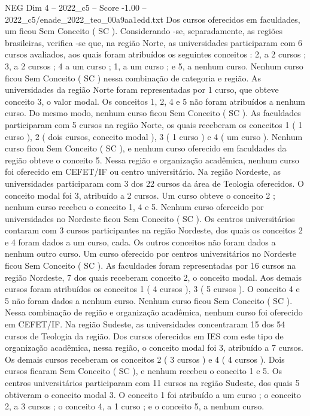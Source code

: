 \begin{textsample}{NEG Dim 4 – 2022\_c5 – Score -1.00 – 2022\_c5/enade\_2022\_teo\_00a9aa1edd.txt}
Dos cursos oferecidos em faculdades, um ficou Sem Conceito ( SC ).
Considerando -se, separadamente, as regiões brasileiras, verifica -se que, na região Norte, as universidades participaram com 6 cursos avaliados, aos quais foram atribuídos os seguintes conceitos : 2, a 2 cursos ; 3, a 2 cursos ; 4 a um curso ; 1, a um curso ; e 5, a nenhum curso.
Nenhum curso ficou Sem Conceito ( SC ) nessa combinação de categoria e região.
As universidades da região Norte foram representadas por 1 curso, que obteve conceito 3, o valor modal.
Os conceitos 1, 2, 4 e 5 não foram atribuídos a nenhum curso.
Do mesmo modo, nenhum curso ficou Sem Conceito ( SC ).
As faculdades participaram com 5 cursos na região Norte, os quais receberam os conceitos 1 ( 1 curso ), 2 ( dois cursos, conceito modal ), 3 ( 1 curso ) e 4 ( um curso ).
Nenhum curso ficou Sem Conceito ( SC ), e nenhum curso oferecido em faculdades da região obteve o conceito 5.
Nessa região e organização acadêmica, nenhum curso foi oferecido em CEFET/IF ou centro universitário.
Na região Nordeste, as universidades participaram com 3 dos 22 cursos da área de Teologia oferecidos.
O conceito modal foi 3, atribuído a 2 cursos.
Um curso obteve o conceito 2 ; nenhum curso recebeu o conceito 1, 4 e 5.
Nenhum curso oferecido por universidades no Nordeste ficou Sem Conceito ( SC ).
Os centros universitários contaram com 3 cursos participantes na região Nordeste, dos quais os conceitos 2 e 4 foram dados a um curso, cada.
Os outros conceitos não foram dados a nenhum outro curso.
Um curso oferecido por centros universitários no Nordeste ficou Sem Conceito ( SC ).
As faculdades foram representadas por 16 cursos na região Nordeste, 7 dos quais receberam conceito 2, o conceito modal.
Aos demais cursos foram atribuídos os conceitos 1 ( 4 cursos ), 3 ( 5 cursos ).
O conceito 4 e 5 não foram dados a nenhum curso.
Nenhum curso ficou Sem Conceito ( SC ).
Nessa combinação de região e organização acadêmica, nenhum curso foi oferecido em CEFET/IF.
Na região Sudeste, as universidades concentraram 15 dos 54 cursos de Teologia da região.
Dos cursos oferecidos em IES com este tipo de organização acadêmica, nessa região, o conceito modal foi 3, atribuído a 7 cursos.
Os demais cursos receberam os conceitos 2 ( 3 cursos ) e 4 ( 4 cursos ).
Dois cursos ficaram Sem Conceito ( SC ), e nenhum recebeu o conceito 1 e 5.
Os centros universitários participaram com 11 cursos na região Sudeste, dos quais 5 obtiveram o conceito modal 3.
O conceito 1 foi atribuído a um curso ; o conceito 2, a 3 cursos ; o conceito 4, a 1 curso ; e o conceito 5, a nenhum curso.

\end{textsample}
